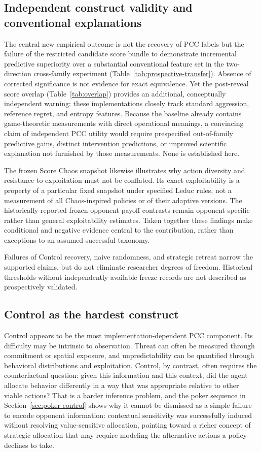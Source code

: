 \documentclass[journal]{IEEEtran}
\begin{document}
\subsection{Independent construct validity and conventional explanations}
\label{sec:incremental}
The central new empirical outcome is not the recovery of PCC labels but the failure of the restricted candidate score bundle to demonstrate incremental predictive superiority over a substantial conventional feature set in the two-direction cross-family experiment (Table~\ref{tab:prospective-transfer}). Absence of corrected significance is not evidence for exact equivalence. Yet the post-reveal score overlap (Table~\ref{tab:overlap}) provides an additional, conceptually independent warning: these implementations closely track standard aggression, reference regret, and entropy features. Because the baseline already contains game-theoretic measurements with direct operational meanings, a convincing claim of independent PCC utility would require prespecified out-of-family predictive gains, distinct intervention predictions, or improved scientific explanation not furnished by those measurements. None is established here.

The frozen Score Chaos snapshot likewise illustrates why action diversity and resistance to exploitation must not be conflated. Its exact exploitability is a property of a particular fixed snapshot under specified Leduc rules, not a measurement of all Chaos-inspired policies or of their adaptive versions. The historically reported frozen-opponent payoff contrasts remain opponent-specific rather than general exploitability estimates. Taken together these findings make conditional and negative evidence central to the contribution, rather than exceptions to an assumed successful taxonomy.

Failures of Control recovery, naive randomness, and strategic retreat narrow the supported claims, but do not eliminate researcher degrees of freedom. Historical thresholds without independently available freeze records are not described as prospectively validated.

\subsection{Control as the hardest construct}

Control appears to be the most implementation-dependent PCC component. Its difficulty may be intrinsic to observation. Threat can often be measured through commitment or spatial exposure, and unpredictability can be quantified through behavioral distributions and exploitation. Control, by contrast, often requires the counterfactual question: given this information and this context, did the agent allocate behavior differently in a way that was appropriate relative to other viable actions? That is a harder inference problem, and the poker sequence in Section~\ref{sec:poker-control} shows why it cannot be dismissed as a simple failure to encode opponent information: contextual sensitivity was successfully induced without resolving value-sensitive allocation, pointing toward a richer concept of strategic allocation that may require modeling the alternative actions a policy declines to take.
\end{document}

